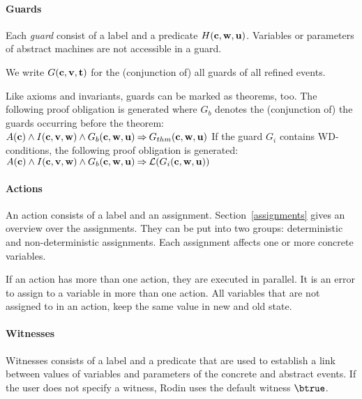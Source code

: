 \paragraph{Guards}
Each \emph{guard} consist of a label and a predicate $H(\mathbf{c},\mathbf{w},\mathbf{u})$.
Variables or parameters of abstract machines are not accessible in a guard.

We write $G(\mathbf{c},\mathbf{v},\mathbf{t})$ for the (conjunction of) all guards of all refined events.

Like axioms and invariants, guards can be marked as theorems, too. The following
proof obligation is generated where $G_b$ denotes the (conjunction of) the guards occurring before the theorem:
%
{$A(\mathbf{c}) \land I(\mathbf{c},\mathbf{v},\mathbf{w}) \land G_b(\mathbf{c},\mathbf{w},\mathbf{u}) 
\mathbin\Rightarrow G_{thm}(\mathbf{c},\mathbf{w},\mathbf{u})$}
If the guard $G_i$ contains WD-conditions, the following proof obligation is generated:
%
{$A(\mathbf{c}) \land I(\mathbf{c},\mathbf{v},\mathbf{w}) \land G_b(\mathbf{c},\mathbf{w},\mathbf{u}) 
\mathbin\Rightarrow \mathcal{L}(G_i(\mathbf{c},\mathbf{w},\mathbf{u}))$}


\paragraph{Actions}
\label{actions}
An action consists of a label and an assignment.
Section~\ref{assignments} gives an overview over the assignments.
They can be put into two groups: deterministic and non-deterministic assignments.
Each assignment affects one or more concrete variables.

If an action has more than one action, they are executed in parallel. 
It is an error to assign to a variable in more than one action.
All variables that are not assigned to in an action, keep the same value in new and old state.

\paragraph{Witnesses}
Witnesses consists of a label and a predicate that are used to establish a link between values 
  of variables and parameters of the concrete and abstract events.
If the user does not specify a witness, Rodin uses the default witness $\btrue$.

